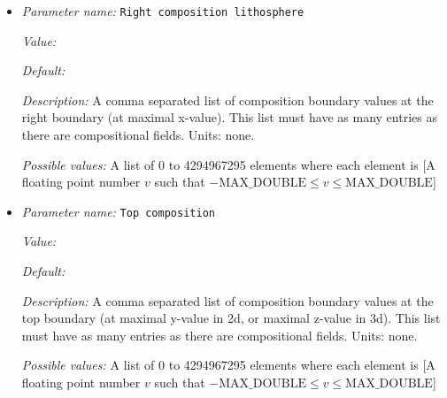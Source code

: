 \begin{itemize}
{\it Value:} 


{\it Default:} 


{\it Description:} A comma separated list of composition boundary values at the right boundary (at maximal x-value). This list must have as many entries as there are compositional fields. Units: none.


{\it Possible values:} A list of 0 to 4294967295 elements where each element is [A floating point number $v$ such that $-\text{MAX\_DOUBLE} \leq v \leq \text{MAX\_DOUBLE}$]
\item {\it Parameter name:} {\tt Right composition lithosphere}
\label{parameters:Boundary composition model/Box with lithosphere boundary indicators/Right composition lithosphere}
\label{parameters:Boundary_20composition_20model/Box_20with_20lithosphere_20boundary_20indicators/Right_20composition_20lithosphere}


{\it Value:} 


{\it Default:} 


{\it Description:} A comma separated list of composition boundary values at the right boundary (at maximal x-value). This list must have as many entries as there are compositional fields. Units: none.


{\it Possible values:} A list of 0 to 4294967295 elements where each element is [A floating point number $v$ such that $-\text{MAX\_DOUBLE} \leq v \leq \text{MAX\_DOUBLE}$]
\item {\it Parameter name:} {\tt Top composition}
\label{parameters:Boundary composition model/Box with lithosphere boundary indicators/Top composition}
\label{parameters:Boundary_20composition_20model/Box_20with_20lithosphere_20boundary_20indicators/Top_20composition}


{\it Value:} 


{\it Default:} 


{\it Description:} A comma separated list of composition boundary values at the top boundary (at maximal y-value in 2d, or maximal z-value in 3d). This list must have as many entries as there are compositional fields. Units: none.


{\it Possible values:} A list of 0 to 4294967295 elements where each element is [A floating point number $v$ such that $-\text{MAX\_DOUBLE} \leq v \leq \text{MAX\_DOUBLE}$]
\end{itemize}


